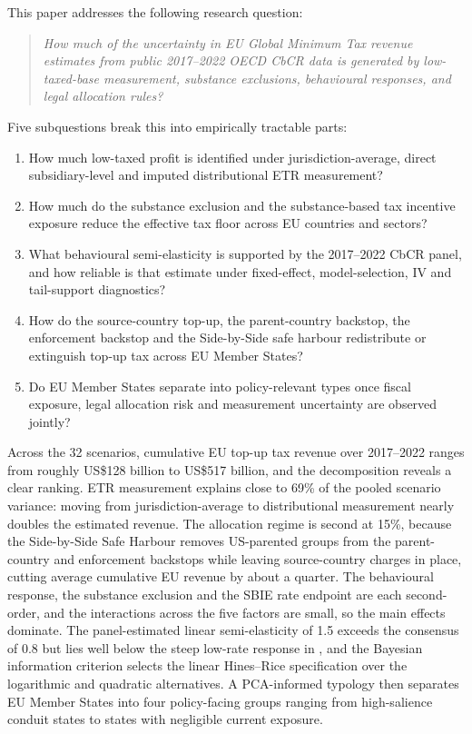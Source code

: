 \documentclass[11pt,a4paper]{article}
\begin{document}
This paper addresses the following research question:
\begin{quote}
\textit{How much of the uncertainty in EU Global Minimum Tax revenue estimates from public 2017--2022 OECD CbCR data is generated by low-taxed-base measurement, substance exclusions, behavioural responses, and legal allocation rules?}
\end{quote}
Five subquestions break this into empirically tractable parts:
\begin{enumerate}[nosep,label=\textit{SQ\arabic*},leftmargin=2.5em]
  \item How much low-taxed profit is identified under jurisdiction-average, direct subsidiary-level and imputed distributional ETR measurement?
  \item How much do the substance exclusion and the substance-based tax incentive exposure reduce the effective tax floor across EU countries and sectors?
  \item What behavioural semi-elasticity is supported by the 2017--2022 CbCR panel, and how reliable is that estimate under fixed-effect, model-selection, IV and tail-support diagnostics?
  \item How do the source-country top-up, the parent-country backstop, the enforcement backstop and the Side-by-Side safe harbour redistribute or extinguish top-up tax across EU Member States?
  \item Do EU Member States separate into policy-relevant types once fiscal exposure, legal allocation risk and measurement uncertainty are observed jointly?
\end{enumerate}

Across the 32 scenarios, cumulative EU top-up tax revenue over 2017--2022 ranges from roughly US\$128 billion to US\$517 billion, and the decomposition reveals a clear ranking. ETR measurement explains close to 69\% of the pooled scenario variance: moving from jurisdiction-average to distributional measurement nearly doubles the estimated revenue. The allocation regime is second at 15\%, because the Side-by-Side Safe Harbour removes US-parented groups from the parent-country and enforcement backstops while leaving source-country charges in place, cutting average cumulative EU revenue by about a quarter. The behavioural response, the substance exclusion and the SBIE rate endpoint are each second-order, and the interactions across the five factors are small, so the main effects dominate. The panel-estimated linear semi-elasticity of 1.5 exceeds the \citet{heckemeyer2017} consensus of 0.8 but lies well below the steep low-rate response in \citet{dowd2017}, and the Bayesian information criterion selects the linear Hines--Rice specification over the logarithmic and quadratic alternatives. A PCA-informed typology then separates EU Member States into four policy-facing groups ranging from high-salience conduit states to states with negligible current exposure.
\end{document}
